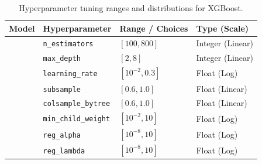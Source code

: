 \begin{table}[htbp]
    \centering
    {\footnotesize
    \setlength{\tabcolsep}{3pt}
    \caption{Hyperparameter tuning ranges and distributions for XGBoost.}
    \label{tab:hyperparameters}
    \begin{tabular}{>{\raggedright\arraybackslash}p{} >{\raggedright\arraybackslash}p{} >{\raggedright\arraybackslash}p{} >{\raggedright\arraybackslash}p{}}
        \toprule
        \textbf{Model} & \textbf{Hyperparameter} & \textbf{Range / Choices} & \textbf{Type (Scale)} \\
        \midrule

        \multirow{8}{*}{XGBoost}
        & \texttt{n\_estimators} & $[100, 800]$ & Integer (Linear) \\
        & \texttt{max\_depth} & $[2, 8]$ & Integer (Linear) \\
        & \texttt{learning\_rate} & $[10^{-2}, 0.3]$ & Float (Log) \\
        & \texttt{subsample} & $[0.6, 1.0]$ & Float (Linear) \\
        & \texttt{colsample\_bytree} & $[0.6, 1.0]$ & Float (Linear) \\
        & \texttt{min\_child\_weight} & $[10^{-2}, 10]$ & Float (Log) \\
        & \texttt{reg\_alpha} & $[10^{-8}, 10]$ & Float (Log) \\
        & \texttt{reg\_lambda} & $[10^{-8}, 10]$ & Float (Log) \\

        \bottomrule
    \end{tabular}
    }
\end{table}
